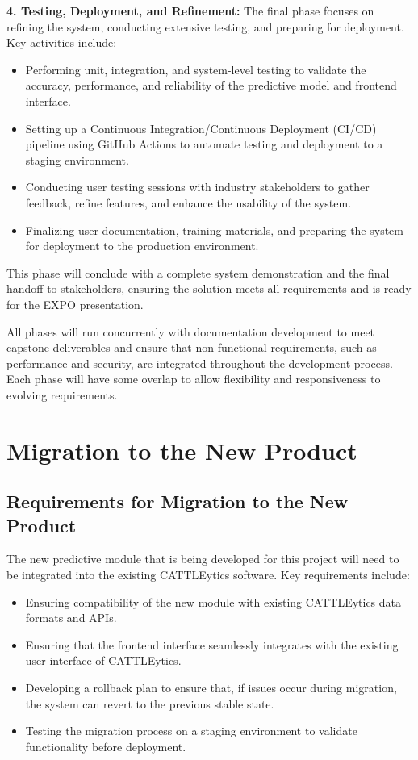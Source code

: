 \documentclass[12pt]{article}
\begin{document}
\textbf{4. Testing, Deployment, and Refinement:} The final phase focuses on
refining the system, conducting extensive testing, and preparing for deployment.
Key activities include:
\begin{itemize}
    \item Performing unit, integration, and system-level testing to validate the
    accuracy, performance, and reliability of the predictive model and frontend
    interface.
    \item Setting up a Continuous Integration/Continuous Deployment (CI/CD)
    pipeline using GitHub Actions to automate testing and deployment to a
    staging environment.
    \item Conducting user testing sessions with industry stakeholders to gather
    feedback, refine features, and enhance the usability of the system.
    \item Finalizing user documentation, training materials, and preparing the
    system for deployment to the production environment.
\end{itemize}
This phase will conclude with a complete system demonstration and the final
handoff to stakeholders, ensuring the solution meets all requirements and is
ready for the EXPO presentation.

All phases will run concurrently with documentation development to meet capstone
deliverables and ensure that non-functional requirements, such as performance
and security, are integrated throughout the development process. Each phase will
have some overlap to allow flexibility and responsiveness to evolving
requirements.


\section{Migration to the New Product}
\subsection{Requirements for Migration to the New Product}
The new predictive module that is being developed for this project will need to
be integrated into the existing CATTLEytics software. Key requirements include:
\begin{itemize}
    \item Ensuring compatibility of the new module with existing CATTLEytics
    data formats and APIs.
    \item Ensuring that the frontend interface seamlessly integrates with the
    existing user interface of CATTLEytics.
    \item Developing a rollback plan to ensure that, if issues occur during
    migration, the system can revert to the previous stable state.
    \item Testing the migration process on a staging environment to validate
    functionality before deployment.
\end{itemize}
\end{document}
